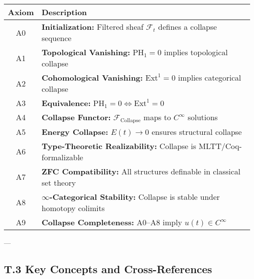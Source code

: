 \documentclass[11pt]{article}
\begin{document}
{\begin{center}
\begin{tabular}{|c|p{10cm}|}
\hline
\textbf{Axiom} & \textbf{Description} \\
\hline
A0 & \textbf{Initialization:} Filtered sheaf $\mathcal{F}_t$ defines a collapse sequence \\
A1 & \textbf{Topological Vanishing:} $\mathrm{PH}_1 = 0$ implies topological collapse \\
A2 & \textbf{Cohomological Vanishing:} $\mathrm{Ext}^1 = 0$ implies categorical collapse \\
A3 & \textbf{Equivalence:} $\mathrm{PH}_1 = 0 \Leftrightarrow \mathrm{Ext}^1 = 0$ \\
A4 & \textbf{Collapse Functor:} $\mathcal{F}_{\mathrm{Collapse}}$ maps to $C^\infty$ solutions \\
A5 & \textbf{Energy Collapse:} $E(t) \to 0$ ensures structural collapse \\
A6 & \textbf{Type-Theoretic Realizability:} Collapse is MLTT/Coq-formalizable \\
A7 & \textbf{ZFC Compatibility:} All structures definable in classical set theory \\
A8 & \textbf{$\infty$-Categorical Stability:} Collapse is stable under homotopy colimits \\
A9 & \textbf{Collapse Completeness:} A0–A8 imply $u(t) \in C^\infty$ \\
\hline
\end{tabular}
\end{center}

---

\subsection*{T.3 Key Concepts and Cross-References}

}
\end{document}
